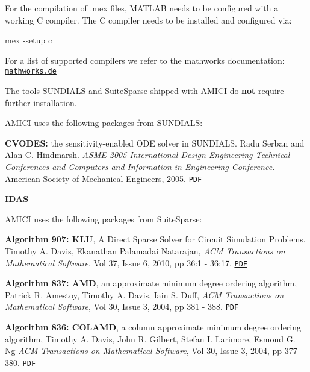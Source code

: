 For the compilation of .mex files, M\+A\+T\+L\+A\+B needs to be configured with a working C compiler. The C compiler needs to be installed and configured via\+:


\begin{DoxyCode}
mex -setup c 
\end{DoxyCode}


For a list of supported compilers we refer to the mathworks documentation\+: \href{http://de.mathworks.com/support/compilers/R2015b/index.html}{\tt mathworks.\+de}

The tools S\+U\+N\+D\+I\+A\+L\+S and Suite\+Sparse shipped with A\+M\+I\+C\+I do {\bfseries not} require further installation.

A\+M\+I\+C\+I uses the following packages from S\+U\+N\+D\+I\+A\+L\+S\+:

{\bfseries C\+V\+O\+D\+E\+S\+:} the sensitivity-\/enabled O\+D\+E solver in S\+U\+N\+D\+I\+A\+L\+S. Radu Serban and Alan C. Hindmarsh. {\itshape A\+S\+M\+E 2005 International Design Engineering Technical Conferences and Computers and Information in Engineering Conference.} American Society of Mechanical Engineers, 2005. \href{http://proceedings.asmedigitalcollection.asme.org/proceeding.aspx?articleid=1588657}{\tt P\+D\+F}

{\bfseries I\+D\+A\+S}

A\+M\+I\+C\+I uses the following packages from Suite\+Sparse\+:

{\bfseries Algorithm 907\+: K\+L\+U}, A Direct Sparse Solver for Circuit Simulation Problems. Timothy A. Davis, Ekanathan Palamadai Natarajan, {\itshape A\+C\+M Transactions on Mathematical Software}, Vol 37, Issue 6, 2010, pp 36\+:1 -\/ 36\+:17. \href{http://dl.acm.org/authorize?305534}{\tt P\+D\+F}

{\bfseries Algorithm 837\+: A\+M\+D}, an approximate minimum degree ordering algorithm, Patrick R. Amestoy, Timothy A. Davis, Iain S. Duff, {\itshape A\+C\+M Transactions on Mathematical Software}, Vol 30, Issue 3, 2004, pp 381 -\/ 388. \href{http://dl.acm.org/authorize?733169}{\tt P\+D\+F}

{\bfseries Algorithm 836\+: C\+O\+L\+A\+M\+D}, a column approximate minimum degree ordering algorithm, Timothy A. Davis, John R. Gilbert, Stefan I. Larimore, Esmond G. Ng {\itshape A\+C\+M Transactions on Mathematical Software}, Vol 30, Issue 3, 2004, pp 377 -\/ 380. \href{http://dl.acm.org/authorize?734450}{\tt P\+D\+F} 